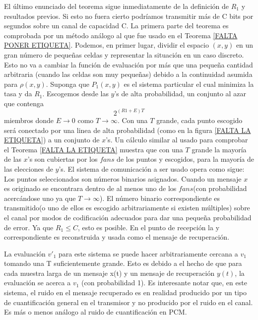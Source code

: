 El \'ultimo enunciado del teorema sigue inmediatamente de la
definici\'on de $R_{1}$ y resultados previos. Si esto no fuera cierto
podr\'iamos transmitir m\'as de C bits por segundos sobre un canal de
capacidad C. La primera parte del teorema es comprobada por un
m\'etodo an\'alogo al que fue usado en el Teorema \ref{FALTA PONER
  ETIQUETA}. Podemos, en primer lugar, dividir el espacio $(x,y)$ en
un gran n\'umero de peque\~{n}as celdas y representar la situaci\'on
en un caso discreto. Esto no va a cambiar la funci\'on de evaluaci\'on
por m\'as que una peque\~{n}a cantidad arbitraria (cuando las celdas
son muy peque\~{n}as) debido a la continuidad asumida para
$\rho(x,y)$. Suponga que $P_1(x,y)$ es el sistema particular el cual
minimiza la tasa y da $R_{1}$. Escogemos desde las $y$'s de alta
probabilidad, un conjunto al azar que contenga
\begin{equation} 2^{(R1 + E)T} \end{equation}
miembros donde $E \rightarrow 0$ como $T \rightarrow \infty$. Con una
$T$ grande, cada punto escogido ser\'a conectado por una linea de alta
probabilidad (como en la figura \ref{FALTA LA ETIQUETA}) a un conjunto
de $x$'s.  Un c\'alculo similar al usado para comprobar el Teorema
\ref{FALTA LA ETIQUETA} muestra que con una $T$ grande la mayor\'ia de
las $x$'s son cubiertas por los $fans$ de los puntos y escogidos, para
la mayor\'ia de las elecciones de $y$'s. El sistema de comunicaci\'on
a ser usado opera como sigue: Los puntos seleccionados son n\'umeros
binarios asignados. Cuando un mensaje $x$ es originado se encontrara
dentro de al menos uno de los $fans$(con probabilidad acerc\'andose
uno ya que $T \rightarrow \infty$). El n\'umero binario
correspondiente es transmitido(o uno de ellos es escogido
arbitrariamente si existen m\'ultiples) sobre el canal por modos de
codificaci\'on adecuados para dar una pequeña probabilidad de
error. Ya que $R_{1} \leq C$, esto es posible. En el punto de
recepci\'on la y correspondiente es reconstruida y usada como el
mensaje de recuperaci\'on.

La evaluaci\'on $v'_{1}$ para este sistema se puede hacer
arbitrariamente cercana a $v_{1}$ tomando una T suficientemente
grande. Esto es debido a el hecho de que para cada muestra larga de un
mensaje x(t) y un mensaje de recuperaci\'on $y(t)$, la evaluaci\'on se
acerca a $v_{1}$ (con probabilidad 1).  Es interesante notar que, en
este sistema, el ruido en el mensaje recuperado es en realidad
producido por un tipo de cuantificaci\'on general en el transmisor y
no producido por el ruido en el canal. Es m\'as o menos an\'alogo al
ruido de cuantificaci\'on en PCM.

